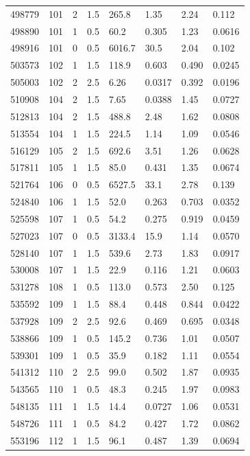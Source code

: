 \documentclass[preview]{standalone}
\begin{document}
{{{{{{{{\begin{tabular}{L{1.2cm}C{1.2cm} C{0.3cm}C{0.5cm} C{1.4cm}C{1.4cm} C{1.4cm}C{1.4cm}}
  498779  &   101  & 2     & 1.5 &  265.8  & 1.35  & 2.24 &  0.112   \\ 
  498890  &   101  & 1     & 0.5 &  60.2  & 0.305  & 1.23 &  0.0616   \\ 
  498916  &   101  & 0     & 0.5 &  6016.7  & 30.5  & 2.04 &  0.102   \\ 
  503573  &   102  & 1     & 1.5 &  118.9  & 0.603  & 0.490 &  0.0245   \\ 
  505003  &   102  & 2     & 2.5 &  6.26  & 0.0317  & 0.392 &  0.0196   \\ 
  510908  &   104  & 2     & 1.5 &  7.65  & 0.0388  & 1.45 &  0.0727   \\ 
  512813  &   104  & 2     & 1.5 &  488.8  & 2.48  & 1.62 &  0.0808   \\ 
  513554  &   104  & 1     & 1.5 &  224.5  & 1.14  & 1.09 &  0.0546   \\ 
  516129  &   105  & 2     & 1.5 &  692.6  & 3.51  & 1.26 &  0.0628   \\ 
  517811  &   105  & 1     & 1.5 &  85.0  & 0.431  & 1.35 &  0.0674   \\ 
  521764  &   106  & 0     & 0.5 &  6527.5  & 33.1  & 2.78 &  0.139   \\ 
  524840  &   106  & 1     & 1.5 &  52.0  & 0.263  & 0.703 &  0.0352   \\ 
  525598  &   107  & 1     & 0.5 &  54.2  & 0.275  & 0.919 &  0.0459   \\ 
  527023  &   107  & 0     & 0.5 &  3133.4  & 15.9  & 1.14 &  0.0570   \\ 
  528140  &   107  & 1     & 1.5 &  539.6  & 2.73  & 1.83 &  0.0917   \\ 
  530008  &   107  & 1     & 1.5 &  22.9  & 0.116  & 1.21 &  0.0603   \\ 
  531278  &   108  & 1     & 0.5 &  113.0  & 0.573  & 2.50 &  0.125   \\ 
  535592  &   109  & 1     & 1.5 &  88.4  & 0.448  & 0.844 &  0.0422   \\ 
  537928  &   109  & 2     & 2.5 &  92.6  & 0.469  & 0.695 &  0.0348   \\ 
  538866  &   109  & 1     & 0.5 &  145.2  & 0.736  & 1.01 &  0.0507   \\ 
  539301  &   109  & 1     & 0.5 &  35.9  & 0.182  & 1.11 &  0.0554   \\ 
  541312  &   110  & 2     & 2.5 &  99.0  & 0.502  & 1.87 &  0.0935   \\ 
  543565  &   110  & 1     & 0.5 &  48.3  & 0.245  & 1.97 &  0.0983   \\ 
  548135  &   111  & 1     & 1.5 &  14.4  & 0.0727  & 1.06 &  0.0531   \\ 
  548726  &   111  & 1     & 0.5 &  84.2  & 0.427  & 1.72 &  0.0862   \\ 
  553196  &   112  & 1     & 1.5 &  96.1  & 0.487  & 1.39 &  0.0694   \\ 
\hline 
\end{tabular} 

}}}}}}}}
\end{document}
